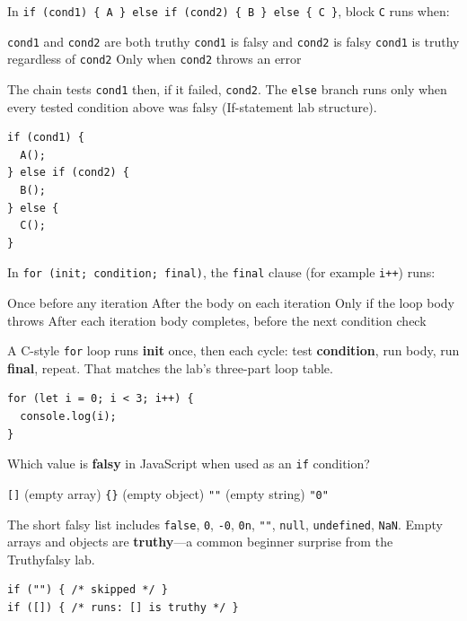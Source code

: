 \question[4]
In \texttt{if (cond1) \{ A \} else if (cond2) \{ B \} else \{ C \}}, block \texttt{C} runs when:
\begin{choices}
  \choice \texttt{cond1} and \texttt{cond2} are both truthy
  \CorrectChoice \texttt{cond1} is falsy and \texttt{cond2} is falsy
  \choice \texttt{cond1} is truthy regardless of \texttt{cond2}
  \choice Only when \texttt{cond2} throws an error
\end{choices}
\begin{solution}
  The chain tests \texttt{cond1} then, if it failed, \texttt{cond2}. The \texttt{else} branch runs only when every tested condition above was falsy (If-statement lab structure).
\begin{lstlisting}[style=jsexam]
if (cond1) {
  A();
} else if (cond2) {
  B();
} else {
  C();
}
\end{lstlisting}
\end{solution}

\newpage

\question[4]
In \texttt{for (init; condition; final)}, the \texttt{final} clause (for example \texttt{i++}) runs:
\begin{choices}
  \choice Once before any iteration
  \choice After the body on each iteration
  \choice Only if the loop body throws
  \CorrectChoice After each iteration body completes, before the next condition check
\end{choices}
\begin{solution}
  A C-style \texttt{for} loop runs \textbf{init} once, then each cycle: test \textbf{condition}, run body, run \textbf{final}, repeat. That matches the lab's three-part loop table.
\begin{lstlisting}[style=jsexam]
for (let i = 0; i < 3; i++) {
  console.log(i);
}
\end{lstlisting}
\end{solution}

\question[4]
Which value is \textbf{falsy} in JavaScript when used as an \texttt{if} condition?
\begin{choices}
  \choice \texttt{[]} (empty array)
  \choice \texttt{\{\}} (empty object)
  \CorrectChoice \texttt{""} (empty string)
  \choice \texttt{"0"}
\end{choices}
\begin{solution}
  The short falsy list includes \texttt{false}, \texttt{0}, \texttt{-0}, \texttt{0n}, \texttt{""}, \texttt{null}, \texttt{undefined}, \texttt{NaN}. Empty arrays and objects are \textbf{truthy}---a common beginner surprise from the Truthyfalsy lab.
\begin{lstlisting}[style=jsexam]
if ("") { /* skipped */ }
if ([]) { /* runs: [] is truthy */ }
\end{lstlisting}
\end{solution}

